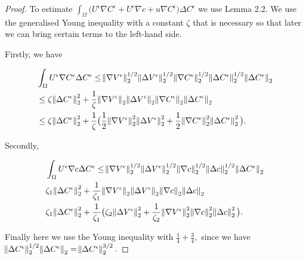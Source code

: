\documentclass[11pt]{article}
\begin{document}
\begin{proof}
To estimate $\int_\Omega \big ( U^\epsilon \nabla C^\epsilon  + U^\epsilon \nabla c + u \nabla C^\epsilon \big ) \Delta C^\epsilon$ we use Lemma 2.2. 
We use the generalised Young inequality with a constant $\zeta$ that is necessary so that later we can bring certain terms to the left-hand side.

Firstly, we have

\begin{equation}
  \begin{split}
    & \int_\Omega U^\epsilon \nabla C^\epsilon \Delta C^\epsilon \leq \norm{\nabla V^\epsilon}_2^{1/2} \norm{\Delta V^\epsilon}_2^{1/2} \norm{\nabla C^\epsilon}_2^{1/2} \norm{\Delta C^\epsilon}_2^{1/2} \norm{\Delta C^\epsilon}_2 \\
    & \leq \zeta \norm{\Delta C^\epsilon}_2^2 + \frac{1}{\zeta} \norm{\nabla V^\epsilon}_2 \norm{\Delta V^\epsilon}_2 \norm{\nabla C^\epsilon}_2 \norm{\Delta C^\epsilon}_2 \\
    & \leq \zeta \norm{\Delta C^\epsilon}_2^2 + \frac{1}{\zeta} \big ( \frac{1}{2} \norm{\nabla V^\epsilon}^2_2 \norm{\Delta V^\epsilon}^2_2 + \frac{1}{2} \norm{\nabla C^\epsilon}^2_2 \norm{\Delta C^\epsilon}^2_2 \big ).
  \end{split}
\end{equation}

Secondly,

\begin{equation}
  \begin{split}
    & \int_\Omega U^\epsilon \nabla c \Delta C^\epsilon \leq \norm{\nabla V^\epsilon}_2^{1/2} \norm{\Delta V^\epsilon}_2^{1/2} \norm{\nabla c}_2^{1/2} \norm{\Delta c}_2^{1/2} \norm{\Delta C^\epsilon}_2 \\
    & \zeta_1 \norm{\Delta C^\epsilon}^2_2 + \frac{1}{\zeta_1} \norm{\nabla V^\epsilon}_2 \norm{\Delta V^\epsilon}_2 \norm{\nabla c}_2 \norm{\Delta c}_2 \\
    & \zeta_1 \norm{\Delta C^\epsilon}^2_2 + \frac{1}{\zeta_1} \big (\zeta_2 \norm{\Delta V^\epsilon}_2^2 + \frac{1}{\zeta_2}  \norm{\nabla V^\epsilon}^2_2  \norm{\nabla c}^2_2 \norm{\Delta c}^2_2 \big ).
  \end{split}
\end{equation}

Finally here we use the Young inequality with $\frac{1}{4} + \frac{3}{4},$ since we have $\norm{\Delta C^\epsilon}_2^{1/2} \norm{\Delta C^\epsilon}_2 = \norm{\Delta C^\epsilon}_2^{3/2}.$


\end{proof}
\end{document}
